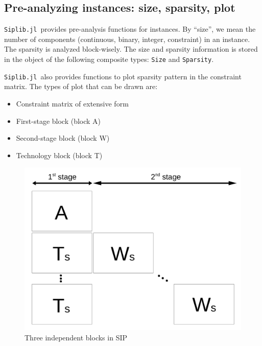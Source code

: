 \documentclass{hitec}
\newcommand{\smps}{\textsf{SMPS}}
\newcommand{\jumpmodel}{\texttt{JuMP.Model}}
\newcommand{\siplibjl}{\texttt{Siplib.jl}}
\begin{document}
	
	
	\subsection{Pre-analyzing instances: size, sparsity, plot}
	\siplibjl\ provides pre-analysis functions for instances. By ``size'', we mean the number of components (continuous, binary, integer, constraint) in an instance. The sparsity is analyzed block-wisely. The size and sparsity information is stored in the object of the following composite types: \texttt{Size} and \texttt{Sparsity}.
	
	\siplibjl\ also provides functions to plot sparsity pattern in the constraint matrix. The types of plot that can be drawn are:
	\begin{itemize}
		\item Constraint matrix of extensive form
		\item First-stage block (block A)
		\item Second-stage block (block W)
		\item Technology block (block T)
	\end{itemize}

	\begin{figure}[H]
		\centering
		\includegraphics[width=0.7\linewidth]{drawings/stagewise_sparsity}
		\caption{Three independent blocks in SIP}
		\label{fig:stagewise_sparsity}
	\end{figure}
\end{document}
